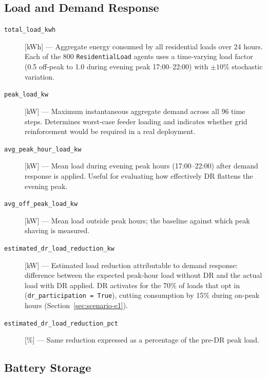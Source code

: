 \subsection*{Load and Demand Response}

\begin{description}

\item[\texttt{total\_load\_kwh}] [kWh] ---
  Aggregate energy consumed by all residential loads over 24 hours.  Each of
  the 800 \texttt{ResidentialLoad} agents uses a time-varying load factor
  (0.5 off-peak to 1.0 during evening peak 17:00--22:00) with $\pm10\%$
  stochastic variation.

\item[\texttt{peak\_load\_kw}] [kW] ---
  Maximum instantaneous aggregate demand across all 96 time steps.  Determines
  worst-case feeder loading and indicates whether grid reinforcement would be
  required in a real deployment.

\item[\texttt{avg\_peak\_hour\_load\_kw}] [kW] ---
  Mean load during evening peak hours (17:00--22:00) after demand response is
  applied.  Useful for evaluating how effectively DR flattens the evening peak.

\item[\texttt{avg\_off\_peak\_load\_kw}] [kW] ---
  Mean load outside peak hours; the baseline against which peak shaving is
  measured.

\item[\texttt{estimated\_dr\_load\_reduction\_kw}] [kW] ---
  Estimated load reduction attributable to demand response: difference between
  the expected peak-hour load without DR and the actual load with DR applied.
  DR activates for the 70\% of loads that opt in
  (\texttt{dr\_participation = True}), cutting consumption by 15\% during
  on-peak hours (Section~\ref{sec:scenario-e1}).

\item[\texttt{estimated\_dr\_load\_reduction\_pct}] [\%] ---
  Same reduction expressed as a percentage of the pre-DR peak load.

\end{description}

\subsection*{Battery Storage}

